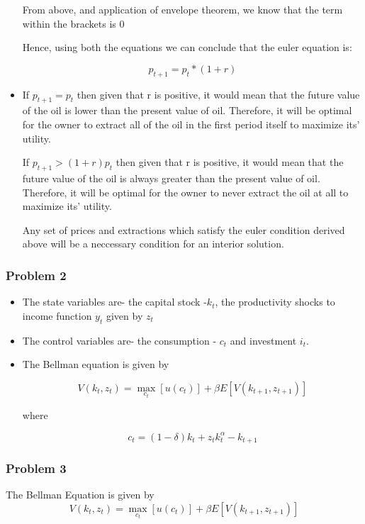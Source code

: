 \documentclass{article}
\begin{document}
\begin{itemize}
From above, and application of envelope theorem, we know that the term within the brackets is 0

Hence, using both the equations we can conclude that the euler equation is:

$$ p_{t+1} = p_{t}*(1+r) $$

\item If $ p_{t+1} =  p_{t} $ then given that r is positive, it would mean that the future value of the oil is lower than the present value of oil. Therefore, it will be optimal for the owner to extract all of the oil in the first period itself to maximize its' utility.

If $ p_{t+1} > (1+r) p_{t} $ then given that r is positive, it would mean that the future value of the oil is always greater than the present value of oil. Therefore, it will be optimal for the owner to never extract the oil at all to maximize its' utility.

Any set of prices and extractions which satisfy the euler condition derived above will be a neccessary condition for an interior solution.


  \end{itemize}

\subsubsection*{Problem 2}

\begin{itemize}
\item The state variables are- the capital stock -$ k_{t} $, the productivity shocks to income function $ y_{t} $ given by $ z_{t} $


\item The control variables are- the consumption  -  $ c_{t} $  and investment $ i_{t} $.

\item The Bellman equation is given by

$$ V(k_{t},z_{t}) = \max_{c_t}  [u(c_{t})] + \beta E[V(k_{t+1},z_{t+1})]  $$

where

$$ c_{t} = (1-\delta)k_{t} + z_{t}k_{t}^\alpha - k_{t+1} $$

\end{itemize}

\subsubsection*{Problem 3}
The Bellman Equation is given by
$$ V(k_{t},z_{t}) = \max_{c_t}  [u(c_{t})] + \beta E[V(k_{t+1},z_{t+1})]  $$
\end{document}

